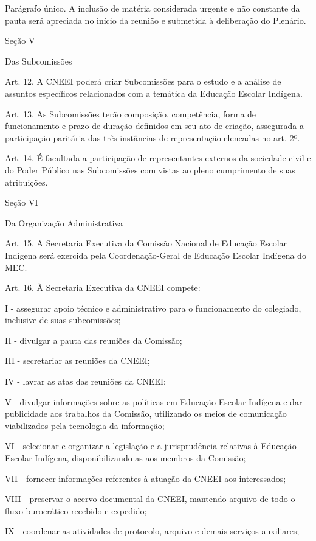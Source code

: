 \documentclass[
]{book}
\begin{document}
Parágrafo único. A inclusão de matéria considerada urgente e não constante da pauta será apreciada no início da reunião e submetida à deliberação do Plenário.

Seção V

Das Subcomissões

Art. 12. A CNEEI poderá criar Subcomissões para o estudo e a análise de assuntos específicos relacionados com a temática da Educação Escolar Indígena.

Art. 13. As Subcomissões terão composição, competência, forma de funcionamento e prazo de duração definidos em seu ato de criação, assegurada a participação paritária das três instâncias de representação elencadas no art. 2º.

Art. 14. É facultada a participação de representantes externos da sociedade civil e do Poder Público nas Subcomissões com vistas ao pleno cumprimento de suas atribuições.

Seção VI

Da Organização Administrativa

Art. 15. A Secretaria Executiva da Comissão Nacional de Educação Escolar Indígena será exercida pela Coordenação-Geral de Educação Escolar Indígena do MEC.

Art. 16. À Secretaria Executiva da CNEEI compete:

I - assegurar apoio técnico e administrativo para o funcionamento do colegiado, inclusive de suas subcomissões;

II - divulgar a pauta das reuniões da Comissão;

III - secretariar as reuniões da CNEEI;

IV - lavrar as atas das reuniões da CNEEI;

V - divulgar informações sobre as políticas em Educação Escolar Indígena e dar publicidade aos trabalhos da Comissão, utilizando os meios de comunicação viabilizados pela tecnologia da informação;

VI - selecionar e organizar a legislação e a jurisprudência relativas à Educação Escolar Indígena, disponibilizando-as aos membros da Comissão;

VII - fornecer informações referentes à atuação da CNEEI aos interessados;

VIII - preservar o acervo documental da CNEEI, mantendo arquivo de todo o fluxo burocrático recebido e expedido;

IX - coordenar as atividades de protocolo, arquivo e demais serviços auxiliares;
\end{document}
